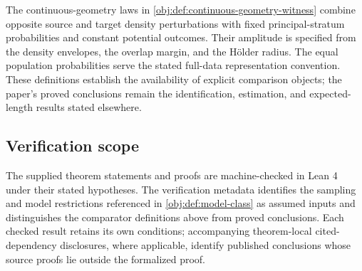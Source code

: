 The continuous-geometry laws  in \cref{obj:def:continuous-geometry-witness} combine opposite source and target density perturbations with fixed principal-stratum probabilities and constant potential outcomes. Their amplitude  is specified from the density envelopes, the overlap margin, and the Hölder radius. The equal population probabilities serve the stated full-data representation convention. These definitions establish the availability of explicit comparison objects; the paper's proved conclusions remain the identification, estimation, and expected-length results stated elsewhere.

\subsection{Verification scope}

The supplied theorem statements and proofs are machine-checked in Lean 4 under their stated hypotheses. The verification metadata identifies the sampling and model restrictions referenced in \cref{obj:def:model-class} as assumed inputs and distinguishes the comparator definitions above from proved conclusions. Each checked result retains its own conditions; accompanying theorem-local cited-dependency disclosures, where applicable, identify published conclusions whose source proofs lie outside the formalized proof.
